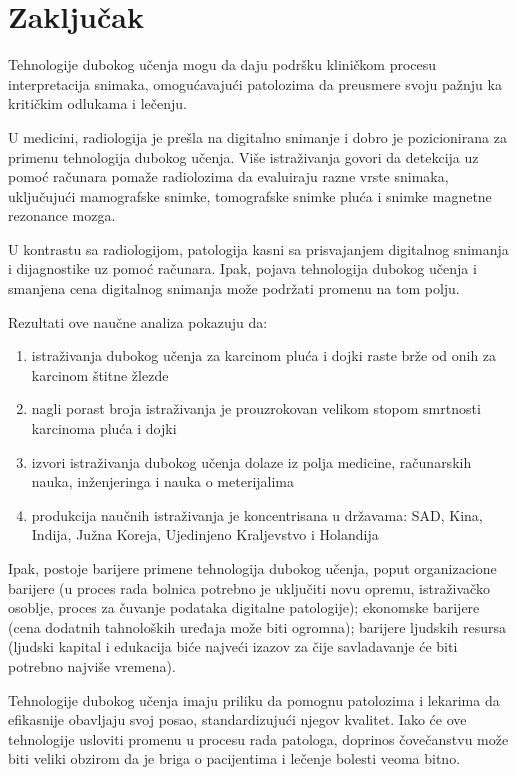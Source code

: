 \documentclass[a4paper]{article}
\begin{document}
\newpage
\section{Zaključak}
\label{sec:diskusija}

Tehnologije dubokog učenja mogu da daju podršku kliničkom procesu interpretacija snimaka, omogućavajući patolozima da preusmere svoju pažnju ka kritičkim odlukama i lečenju.

U medicini, radiologija je prešla na digitalno snimanje i dobro je pozicionirana za primenu tehnologija dubokog učenja. Više istraživanja govori da detekcija uz pomoć računara pomaže radiolozima da evaluiraju razne vrste snimaka, uključujući mamografske snimke, tomografske snimke pluća i snimke magnetne rezonance mozga.

U kontrastu sa radiologijom, patologija kasni sa prisvajanjem digitalnog snimanja i dijagnostike uz pomoć računara. Ipak, pojava tehnologija dubokog učenja i smanjena cena digitalnog snimanja može podržati promenu na tom polju.

Rezultati ove naučne analiza pokazuju da:

\begin{enumerate}
  \item istraživanja dubokog učenja za karcinom pluća i dojki raste brže od onih za karcinom štitne žlezde
  \item nagli porast broja istraživanja je prouzrokovan velikom stopom smrtnosti karcinoma pluća i dojki
  \item izvori istraživanja dubokog učenja dolaze iz polja medicine, računarskih nauka, inženjeringa i nauka o meterijalima
  \item produkcija naučnih istraživanja je koncentrisana u državama: SAD, Kina, Indija, Južna Koreja, Ujedinjeno Kraljevstvo i Holandija
\end{enumerate} 

Ipak, postoje barijere primene tehnologija dubokog učenja, poput organizacione barijere (u proces rada bolnica potrebno je uključiti novu opremu, istraživačko osoblje, proces za čuvanje podataka digitalne patologije); ekonomske barijere (cena dodatnih tahnoloških uređaja može biti ogromna);
barijere ljudskih resursa (ljudski kapital i edukacija biće najveći izazov za čije savladavanje će biti potrebno najviše vremena).


Tehnologije dubokog učenja imaju priliku da pomognu patolozima i lekarima da efikasnije obavljaju svoj posao, standardizujući njegov kvalitet. Iako će ove tehnologije usloviti promenu u procesu rada patologa, doprinos čovečanstvu može biti veliki obzirom da je briga o pacijentima i lečenje bolesti veoma bitno.
\end{document}
